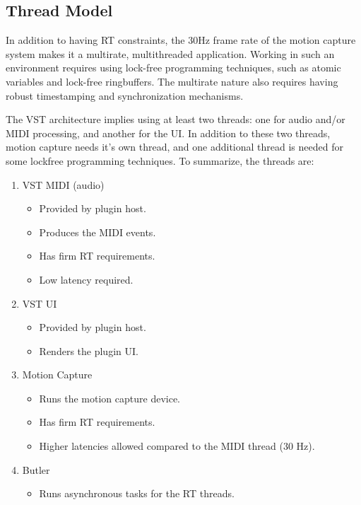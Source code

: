 \subsection{Thread Model}

In addition to having RT constraints,
the 30Hz frame rate of the motion capture system
makes it a multirate, multithreaded application.
Working in such an environment requires using
lock-free programming techniques,
such as atomic variables and lock-free ringbuffers.
The multirate nature also requires having robust timestamping and synchronization mechanisms.

The VST architecture implies using at least two threads:
one for audio and/or MIDI processing,
and another for the UI.
In addition to these two threads,
motion capture needs it's own thread,
and one additional thread is needed for some
lockfree programming techniques.
To summarize, the threads are:
\begin{enumerate}

\item VST MIDI (audio)
\begin{itemize}
\item Provided by plugin host.
\item Produces the MIDI events.
\item Has firm RT requirements.
\item Low latency required.
\end{itemize}

\item VST UI
\begin{itemize}
\item Provided by plugin host.
\item Renders the plugin UI.
\end{itemize}

\item Motion Capture
\begin{itemize}
\item Runs the motion capture device.
\item Has firm RT requirements.
\item Higher latencies allowed compared to the MIDI thread (30 Hz).
\end{itemize}

\item Butler
\begin{itemize}
\item Runs asynchronous tasks for the RT threads.
\end{itemize}

\end{enumerate}

